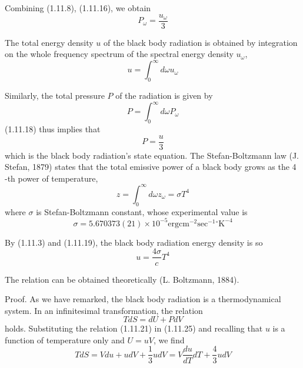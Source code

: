 \documentclass{article}
\begin{document}
Combining (1.11.8), (1.11.16), we obtain
$$
\begin{equation*}
P_{\omega}=\frac{u_{\omega}}{3} \tag{1.11.18}
\end{equation*}
$$

The total energy density $u$ of the black body radiation is obtained by integration on the whole frequency spectrum of the spectral energy density $u_{\omega}$,
$$
\begin{equation*}
u=\int_{0}^{\infty} d \omega u_{\omega} \tag{1.11.19}
\end{equation*}
$$

Similarly, the total pressure $P$ of the radiation is given by
$$
\begin{equation*}
P=\int_{0}^{\infty} d \omega P_{\omega} \tag{1.11.20}
\end{equation*}
$$
(1.11.18) thus implies that
$$
\begin{equation*}
P=\frac{u}{3} \tag{1.11.21}
\end{equation*}
$$
which is the black body radiation's state equation.
The Stefan-Boltzmann law (J. Stefan, 1879) states that the total emissive power of a black body grows as the 4 -th power of temperature,
$$
\begin{equation*}
z=\int_{0}^{\infty} d \omega z_{\omega}=\sigma T^{4} \tag{1.11.22}
\end{equation*}
$$
where $\sigma$ is Stefan-Boltzmann constant, whose experimental value is
$$
\begin{equation*}
\sigma=5.670373(21) \times 10^{-5} \mathrm{erg} \mathrm{cm}^{-2} \mathrm{sec}^{-1}{ }^{\circ} \mathrm{K}^{-4} \tag{1.11.23}
\end{equation*}
$$

By (1.11.3) and (1.11.19), the black body radiation energy density is so
$$
\begin{equation*}
u=\frac{4 \sigma}{c} T^{4} \tag{1.11.24}
\end{equation*}
$$

The relation can be obtained theoretically (L. Boltzmann, 1884).

Proof. As we have remarked, the black body radiation is a thermodynamical system. In an infinitesimal transformation, the relation
$$
\begin{equation*}
T d S=d U+P d V \tag{1.11.25}
\end{equation*}
$$
holds. Substituting the relation (1.11.21) in (1.11.25) and recalling that $u$ is a function of temperature only and $U=u V$, we find
$$
\begin{equation*}
T d S=V d u+u d V+\frac{1}{3} u d V=V \frac{d u}{d T} d T+\frac{4}{3} u d V \tag{1.11.26}
\end{equation*}
$$
\end{document}

